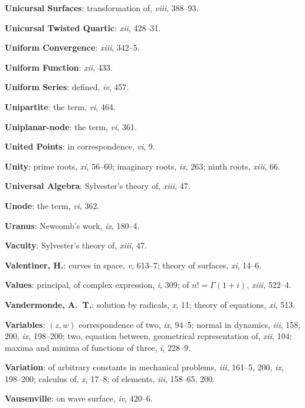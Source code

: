 \documentclass[11pt,a4paper]{article}
\newcommand{\IndexEntry}[1]{\textbf{#1}}
\newcommand{\V}[1]{\textit{#1}} %
\begin{document}
\IndexEntry{Unicursal Surfaces}: transformation of, \V{viii}, 388--93.

\IndexEntry{Unicursal Twisted Quartic}: \V{xii}, 428--31.

\IndexEntry{Uniform Convergence}: \V{xiii}, 342--5.

\IndexEntry{Uniform Function}: \V{xii}, 433.

\IndexEntry{Uniform Series}: defined, \V{iv}, 457.

\IndexEntry{Unipartite}: the term, \V{vi}, 464.

\IndexEntry{Uniplanar-node}: the term, \V{vi}, 361.

\IndexEntry{United Points}: in correspondence, \V{vi}, 9.

\IndexEntry{Unity}: prime roots, \V{xi}, 56--60; imaginary roots, \V{ix}, 263; ninth roots, \V{xiii}, 66.

\IndexEntry{Universal Algebra}: Sylvester's theory of, \V{xiii}, 47.

\IndexEntry{Unode}: the term, \V{vi}, 362.

\IndexEntry{Uranus}: Newcomb's work, \V{ix}, 180--4.

\IndexEntry{Vacuity}: Sylvester's theory of, \V{xiii}, 47.

\IndexEntry{Valentiner, H.}: curves in space, \V{v}, 613--7; theory of surfaces, \V{xi}, 14--6.

\IndexEntry{Values}: principal, of complex expression, \V{i}, 309; of $n! = \Gamma(1+i)$, \V{xiii}, 522--4.

\IndexEntry{Vandermonde, A.\ T.}: solution by radicals, \V{x}, 11; theory of equations, \V{xi}, 513.

\IndexEntry{Variables}: $(z, w)$ correspondence of two, \V{ix}, 94--5; normal in dynamics, \V{iii}, 158, 200, \V{ix}, 198--200; two, equation between, geometrical representation of, \V{xii}, 104; maxima and minima of functions of three, \V{i}, 228--9.

\newpage

\setcounter{page}{131}

\IndexEntry{Variation}: of arbitrary constants in mechanical problems, \V{iii}, 161--5, 200, \V{ix}, 198--200; calculus of, \V{x}, 17--8; of elements, \V{iii}, 158--65, 200.

\IndexEntry{Vausenville}: on wave surface, \V{iv}, 420--6.
\end{document}
